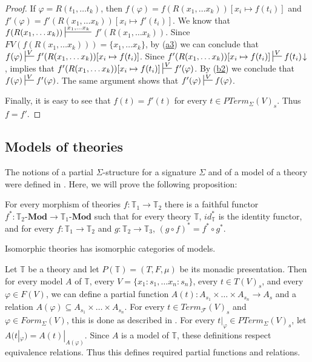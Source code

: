 \documentclass[reqno]{amsart}
\newcommand{\axref}[1]{(\hyperref[ax:#1]{#1})}
\theoremstyle{definition}
\theoremstyle{remark}
\newcommand{\cat}[1]{\mathbf{#1}}
\newcommand{\Mod}[1]{#1\text{-}\cat{Mod}}
\numberwithin{figure}{section}
\begin{document}
\begin{proof}
If $\varphi = R(t_1, \ldots t_k)$, then $f(\varphi) = f(R(x_1, \ldots x_k))[x_i \mapsto f(t_i)]$
and $f'(\varphi) = f'(R(x_1, \ldots x_k))[x_i \mapsto f'(t_i)]$.
We know that $f(R(x_1, \ldots x_k)) \sststile{}{x_1, \ldots x_k}$ \linebreak $f'(R(x_1, \ldots x_k))$.
Since $FV(f(R(x_1, \ldots x_k))) = \{ x_1, \ldots x_k \}$, by \axref{a3} we can conclude that $f(\varphi) \sststile{}{V} f'(R(x_1, \ldots x_k))[x_i \mapsto f(t_i)]$.
Since $f'(R(x_1, \ldots x_k))[x_i \mapsto f(t_i)] \sststile{}{V} f(t_i)\!\downarrow$,  implies that
$f'(R(x_1, \ldots x_k))[x_i \mapsto f(t_i)] \sststile{}{V} f'(\varphi)$.
By \axref{b2} we conclude that $f(\varphi) \sststile{}{V} f'(\varphi)$.
The same argument shows that $f'(\varphi) \sststile{}{V} f(\varphi)$.

Finally, it is easy to see that $f(t) = f'(t)$ for every $t \in PTerm_\Sigma(V)_s$.
Thus $f = f'$.
\end{proof}

\subsection{Models of theories}

The notions of a partial $\Sigma$-structure for a signature $\Sigma$ and of a model of a theory were defined in \cite{PHL}.
Here, we will prove the following proposition:

\begin{prop}
For every morphism of theories $f : \mathbb{T}_1 \to \mathbb{T}_2$ there is a faithful functor $f^* : \Mod{\mathbb{T}_2} \to \Mod{\mathbb{T}_1}$ such that
for every theory $\mathbb{T}$, $id_\mathbb{T}^*$ is the identity functor,
and for every $f : \mathbb{T}_1 \to \mathbb{T}_2$ and $g : \mathbb{T}_2 \to \mathbb{T}_3$, $(g \circ f)^* = f^* \circ g^*$.
\end{prop}

\begin{cor}
Isomorphic theories has isomorphic categories of models.
\end{cor}

Let $\mathbb{T}$ be a theory and let $P(\mathbb{T}) = (T,F,\mu)$ be its monadic presentation.
Then for every model $A$ of $\mathbb{T}$, every $V = \{ x_1 : s_1, \ldots x_n : s_n \}$, every $t \in T(V)_s$, and every $\varphi \in F(V)$,
    we can define a partial function $A(t) : A_{s_1} \times \ldots \times A_{s_n} \to A_s$ and a relation $A(\varphi) \subseteq A_{s_1} \times \ldots \times A_{s_n}$.
For every $t \in Term_\mathcal{F}(V)_s$ and $\varphi \in Form_\Sigma(V)$, this is done as described in \cite{PHL}.
For every $t|_\varphi \in PTerm_\Sigma(V)_s$, let $A(t|_\varphi) = A(t)|_{A(\varphi)}$.
Since $A$ is a model of $\mathbb{T}$, these definitions respect equivalence relations.
Thus this defines required partial functions and relations.
\end{document}
